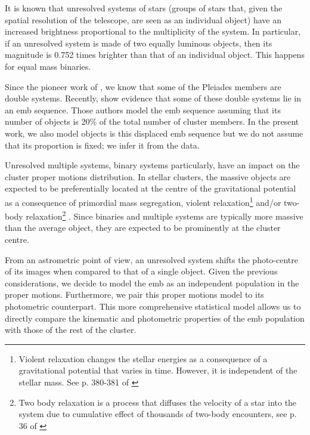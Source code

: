 It is known that unresolved systems of stars (groups of stars that, given the spatial resolution of the telescope, are seen as an individual object) have an increased brightness proportional to the multiplicity of the system. In particular, if an unresolved system is made of two equally luminous objects, then its magnitude is 0.752 times brighter than that of an individual object. This happens for equal mass binaries.

Since the pioneer work of \citet{Trumpler1921}, we know that some of the Pleiades members are double systems. Recently, \citet{Sarro2014} show evidence that some of these double systems lie in an \gls{emb} sequence. Those authors model the \gls{emb} sequence assuming that its number of objects is 20\% of the total number of cluster members. In the present work, we also model objects is this displaced \gls{emb} sequence  but we do not assume that its proportion is fixed; we infer it from the data. 

Unresolved multiple systems, binary systems particularly, have an impact on the cluster proper motions distribution. In stellar clusters, the massive objects are expected to be preferentially located at the centre of the gravitational potential as a consequence of primordial mass segregation, violent relaxation\footnote{Violent relaxation changes the stellar energies as a consequence of a gravitational potential that varies in time. However, it is independent of the stellar mass. See p. 380-381 of  \citet{2008gady.book.....B}} and/or two-body relaxation\footnote{Two body relaxation is a process that diffuses the velocity of a star into the system due to cumulative effect of thousands of two-body encounters, see p. 36 of \citet{2008gady.book.....B}} \citep{2016MNRAS.459L.119P}. Since binaries and multiple systems are typically more massive than the average object, they are expected to be prominently at the cluster centre. 


From an astrometric point of view, an unresolved system shifts the photo-centre of its images when compared to that of a single object. Given the previous considerations, we decide to model the \gls{emb} as an independent population in the proper motions. Furthermore, we pair this proper motions model to its photometric counterpart. This more comprehensive statistical model allows us to directly compare the kinematic and photometric properties of the \gls{emb} population with those of the rest of the cluster. 

